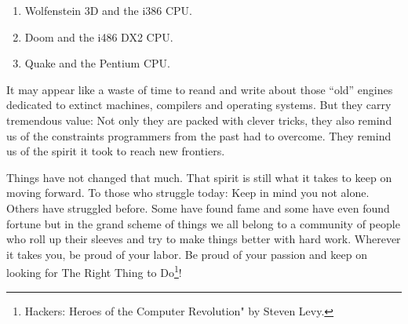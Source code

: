 \documentclass[book.tex]{subfiles}
\begin{document}
\begin{enumerate}
\item Wolfenstein 3D and the i386 CPU.
\item Doom and the i486 DX2 CPU.
\item Quake and the Pentium CPU.
\end{enumerate}

\bigskip

It may appear like a waste of time to reand and write about those ``old'' engines dedicated to extinct machines, compilers and operating systems. But they carry tremendous value: Not only they are packed with clever tricks, they also remind us of the constraints programmers from the past had to overcome. They remind us of the spirit it took to reach new frontiers.\\
\par
Things have not changed that much. That spirit is still what it takes to keep on moving forward. To those who struggle today: Keep in mind you not alone. Others have struggled before. Some have found fame and some have even found fortune but in the grand scheme of things we all belong to a community of people who roll up their sleeves and try to make things better with hard work. Wherever it takes you, be proud of your labor. Be proud of your passion and keep on looking for The Right Thing to Do\footnote{Hackers: Heroes of the Computer Revolution" by Steven Levy.}!\\



\end{document}
